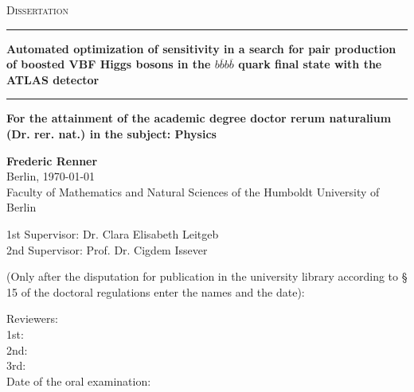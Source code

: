 
\begin{titlepage}
    \begin{center}
	{\scshape\Large Dissertation\\}
	\vspace{.1cm}
	\rule[1pt]{\textwidth}{1.5pt}
    \LARGE{\textbf{Automated optimization of sensitivity in a search for pair production of boosted VBF Higgs bosons in the $b\overline{b}b\overline{b}$ quark final state with the ATLAS detector
	}}
    \rule[11pt]{\textwidth}{1.5pt}
	
    {\normalsize\textbf{For the attainment of the academic degree doctor rerum naturalium (Dr. rer. nat.) in the subject: Physics}} 
    \vspace{1cm}

    \Large{\textbf{Frederic Renner\\}}
	Berlin, \today\\
    \vspace{1cm}
    \large
	Faculty of Mathematics and Natural Sciences of the Humboldt University of Berlin\\
    \vspace{1cm}

	1st Supervisor: Dr. Clara Elisabeth Leitgeb\\
	2nd Supervisor: Prof. Dr. Cigdem Issever
	\vspace{01cm}


	\newpage 
	(Only after the disputation for publication in the university library according to § 15	of the doctoral regulations enter the names and the date):\\
	\raggedright
	Reviewers: \\
	1st: \\
	2nd: \\
	3rd: \\
	
	Date of the oral examination: 
\end{center}
\end{titlepage}